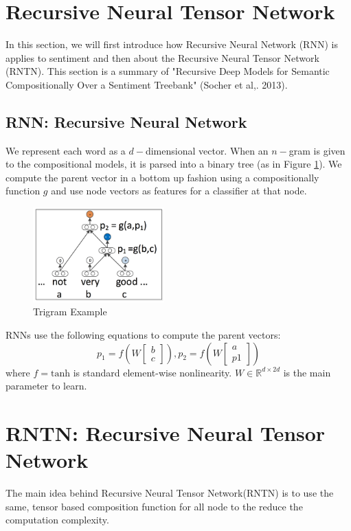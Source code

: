 \section{Recursive Neural Tensor Network}
In this section, we will first introduce how Recursive Neural Network (RNN) is applies to sentiment and then about the Recursive Neural Tensor Network (RNTN). This section is a summary of "Recursive Deep Models for Semantic Compositionally Over a Sentiment Treebank" (Socher et al,. 2013). 
\subsection{RNN: Recursive Neural Network}
We represent each word as a $d-$dimensional vector. When an $n-$gram is given to the compositional models, it is parsed into a binary tree (as in Figure \ref{trigram}). We compute the parent vector in a bottom up fashion using a compositionally function $g$ and use node vectors as features for a classifier at that node. 
\begin{figure}[H]
\begin{center}
\includegraphics[width = 0.45\textwidth]{pic/trigram.png}
\caption{\label{trigram}Trigram Example}
\end{center}
\end{figure}

RNNs use the following equations to compute the parent vectors: 
\begin{equation*}
p_1 = f \left( W 
\begin{bmatrix}
b \\ c
\end{bmatrix}
 \right), 
p_2 = f \left( W 
\begin{bmatrix}
a \\ p1
\end{bmatrix}
 \right)
\end{equation*}
where $f = \textrm{tanh}$ is standard element-wise nonlinearity. $W \in \mathbb{R}^{d \times 2d}$ is the main parameter to learn. 

\section{RNTN: Recursive Neural Tensor Network}

The main idea behind Recursive Neural Tensor Network(RNTN) is to use the same, tensor based composition function for all node to the reduce the computation complexity. 